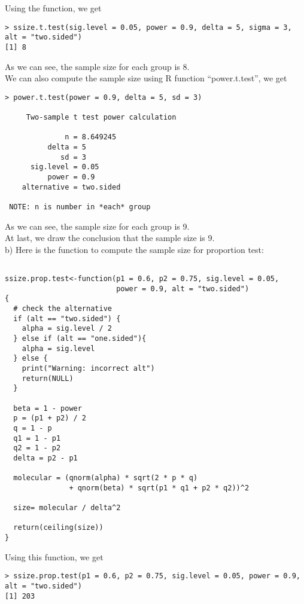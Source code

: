 \documentclass[12pt]{article}
\begin{document}
Using the function, we get

\begin{verbatim}
> ssize.t.test(sig.level = 0.05, power = 0.9, delta = 5, sigma = 3,
alt = "two.sided")
[1] 8
\end{verbatim}

As we can see, the sample size for each group is 8. \\

We can also compute the sample size using R function ``power.t.test'',
we get

\begin{verbatim}
> power.t.test(power = 0.9, delta = 5, sd = 3)

     Two-sample t test power calculation 

              n = 8.649245
          delta = 5
             sd = 3
      sig.level = 0.05
          power = 0.9
    alternative = two.sided

 NOTE: n is number in *each* group 
\end{verbatim}

As we can see, the sample size for each group is 9. \\

At last, we draw the conclusion that the sample size is 9.\\

b) Here is the function to compute the sample size for proportion
test:

\begin{verbatim}

ssize.prop.test<-function(p1 = 0.6, p2 = 0.75, sig.level = 0.05,
                          power = 0.9, alt = "two.sided") 
{
  # check the alternative
  if (alt == "two.sided") {
    alpha = sig.level / 2 
  } else if (alt == "one.sided"){
    alpha = sig.level
  } else {
    print("Warning: incorrect alt")
    return(NULL)
  }

  beta = 1 - power
  p = (p1 + p2) / 2
  q = 1 - p
  q1 = 1 - p1
  q2 = 1 - p2
  delta = p2 - p1

  molecular = (qnorm(alpha) * sqrt(2 * p * q)
               + qnorm(beta) * sqrt(p1 * q1 + p2 * q2))^2 
  
  size= molecular / delta^2

  return(ceiling(size))  
}
\end{verbatim}

Using this function, we get

\begin{verbatim}
> ssize.prop.test(p1 = 0.6, p2 = 0.75, sig.level = 0.05, power = 0.9,
alt = "two.sided")
[1] 203
\end{verbatim}
\end{document}
